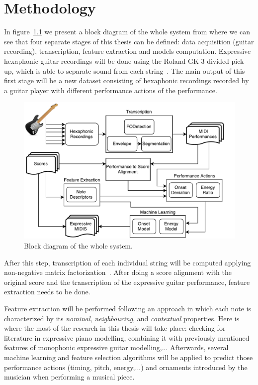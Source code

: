 \chapter{Methodology}
\label{chap:methods}
In figure~\ref{fig:diagram} we present a block diagram of the whole system from where we can see that four separate stages of this thesis can be defined: data acquisition (guitar recording), transcription, feature extraction and models computation. Expressive hexaphonic guitar recordings will be done using the Roland GK-3 divided pick-up, which is able to separate sound from each string~\cite{Angulo2016}. The main output of this first stage will be a new dataset consisting of hexaphonic recordings recorded by a guitar player with different performance actions of the performance. 

\begin{figure}[ht!]
\caption{Block diagram of the whole system.}
\label{fig:diagram}
\centering
\includegraphics[width=\textwidth]{Figures/Diagram.pdf}
\end{figure}

After this step, transcription of each individual string will be computed applying non-negative matrix factorization~\cite{OGrady2009}. After doing a score alignment with the original score and the transcription of the expressive guitar performance, feature extraction needs to be done.

Feature extraction will be performed following an approach in which each note is characterized by its \textit{nominal}, \textit{neighbouring}, and \textit{contextual} properties.  Here is where the most of the research in this thesis will take place:  checking for literature in expressive piano modelling, combining it with previously mentioned features of monophonic expressive guitar modelling,... Afterwards, several machine learning and feature selection algorithms will be applied to predict those performance actions (timing, pitch, energy,...) and ornaments introduced by the musician when performing a musical piece.

